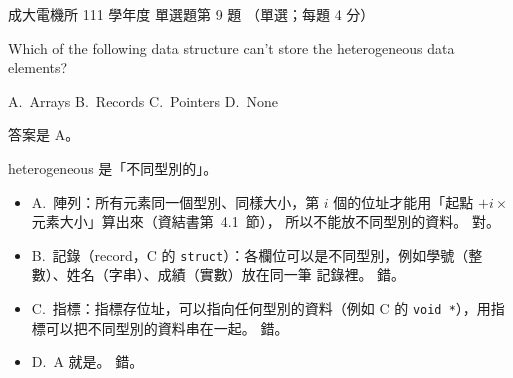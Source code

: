 \begin{pastexam}[label={px:ncku-111-ee-ds-09}]{成大電機所 111 學年度 單選題第 9 題}
（單選；每題 4 分）

Which of the following data structure can't store the heterogeneous data elements?

A.~Arrays \qquad B.~Records \qquad C.~Pointers \qquad D.~None
\end{pastexam}

\begin{pastsoln}
答案是 A。

heterogeneous 是「不同型別的」。
\begin{itemize}
\item A.~陣列：所有元素同一個型別、同樣大小，第 $i$ 個的位址才能用「起點 $+ i \times$ 元素大小」算出來（資結書第~4.1~節），
所以不能放不同型別的資料。 對。
\item B.~記錄（record，C 的 \texttt{struct}）：各欄位可以是不同型別，例如學號（整數）、姓名（字串）、成績（實數）放在同一筆
記錄裡。 錯。
\item C.~指標：指標存位址，可以指向任何型別的資料（例如 C 的 \texttt{void *}），用指標可以把不同型別的資料串在一起。 錯。
\item D.~A 就是。 錯。
\end{itemize}
\end{pastsoln}
